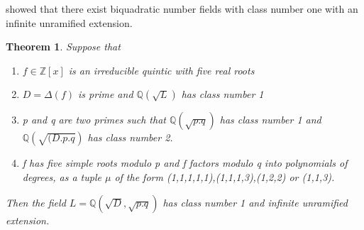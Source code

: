 \documentclass[preprint,12pt,reqno]{elsarticle}
\newtheorem{theorem}{Theorem}
\begin{document}
\cite{MAIR} showed that there exist biquadratic number fields with class number one with an infinite unramified extension. 
\begin{theorem}
\cite{BRIN} Suppose that \begin{enumerate}
    \item $f\in \mathbb{Z}[x]$ is an irreducible quintic with five real roots
    \item $D=\Delta(f)$ is prime and $\mathbb{Q}(\sqrt{L})$ has class number 1
    \item p and q are two primes such that $\mathbb{Q}(\sqrt{p.q})$ has class number 1 and $\mathbb{Q}(\sqrt{(D.p.q})$ has class number 2.
    \item f has five simple roots modulo p and f factors modulo q into polynomials of degrees, as a tuple $\mu$ of the form (1,1,1,1,1),(1,1,1,3),(1,2,2) or (1,1,3).
\end{enumerate}
Then the field $L=\mathbb{Q}(\sqrt{D},\sqrt{p.q})$ has class number 1 and infinite unramified extension.
\end{theorem}
\end{document}
